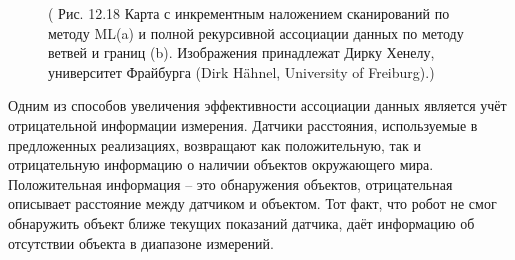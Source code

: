 \documentclass[10pt,a4paper]{article}
\begin{document}
\begin{figure}[H]
	\caption{ ( Рис. 12.18  Карта с инкрементным наложением сканирований по методу ML(a) и полной рекурсивной ассоциации данных по методу ветвей и границ (b). Изображения принадлежат Дирку Хенелу, университет Фрайбурга (Dirk Hähnel, University of Freiburg).) }
	\label{fig:1218orig}
\end{figure}

Одним из способов увеличения эффективности ассоциации данных является учёт отрицательной информации измерения. Датчики расстояния, используемые в предложенных реализациях, возвращают как положительную, так и отрицательную информацию о наличии объектов окружающего мира. Положительная информация – это обнаружения объектов, отрицательная описывает расстояние между датчиком и объектом. Тот факт, что робот не смог обнаружить объект ближе текущих показаний датчика, даёт информацию об отсутствии объекта в диапазоне измерений. 
\end{document}
